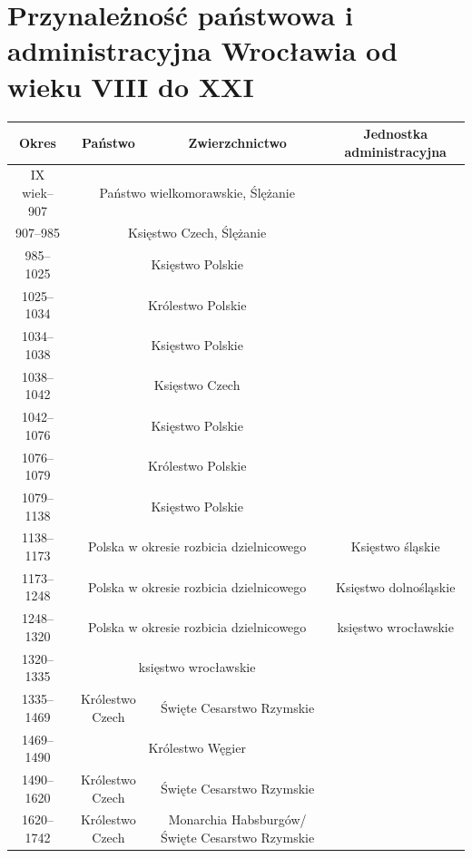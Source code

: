 \documentclass{article}
\begin{document}
\section{Przynależność państwowa i administracyjna Wrocławia od wieku VIII do XXI}
\begin{table}[h!]
    \centering
    \begin{adjustwidth}{-1.2in}{-.5in} 
    \begin{tabular}{|c|c|c|c|}
    \hline
     Okres & Państwo & Zwierzchnictwo & Jednostka administracyjna \\
     \hline
      IX wiek–907 & \multicolumn{2}{c|}{Państwo wielkomorawskie, Ślężanie} & \\
    \hline
    907–985 & \multicolumn{2}{c|}{Księstwo Czech, Ślężanie} & \\
    \hline
    985–1025 & \multicolumn{2}{c|}{Księstwo Polskie} & \\
    \hline
    1025–1034 & \multicolumn{2}{c|}{Królestwo Polskie} & \\
    \hline
    1034–1038 & \multicolumn{2}{c|}{Księstwo Polskie} & \\
    \hline
    1038–1042 & \multicolumn{2}{c|}{Księstwo Czech} & \\
    \hline
    1042–1076 & \multicolumn{2}{c|}{Księstwo Polskie} & \\
    \hline
    1076–1079 & \multicolumn{2}{c|}{Królestwo Polskie} & \\
    \hline
    1079–1138 & \multicolumn{2}{c|}{Księstwo Polskie} & \\
    \hline
    1138–1173 & \multicolumn{2}{c|}{Polska w okresie rozbicia dzielnicowego} & Księstwo śląskie \\
    \hline
    1173–1248 & \multicolumn{2}{c|}{Polska w okresie rozbicia dzielnicowego} & Księstwo dolnośląskie \\
    \hline
    1248–1320 & \multicolumn{2}{c|}{Polska w okresie rozbicia dzielnicowego} & księstwo wrocławskie \\
    \hline
        1320–1335 & \multicolumn{2}{c|}{księstwo wrocławskie} & \\
    \hline
       1335–1469 & Królestwo Czech & Święte Cesarstwo Rzymskie & \\
    \hline
        1469–1490 & \multicolumn{2}{c|}{Królestwo Węgier} & \\
    \hline
        1490–1620 & Królestwo Czech & Święte Cesarstwo Rzymskie & \\
    \hline
        1620–1742 & Królestwo Czech & Monarchia Habsburgów/Święte Cesarstwo Rzymskie & \\

\end{tabular}
\end{adjustwidth}
\end{table}
\end{document}

